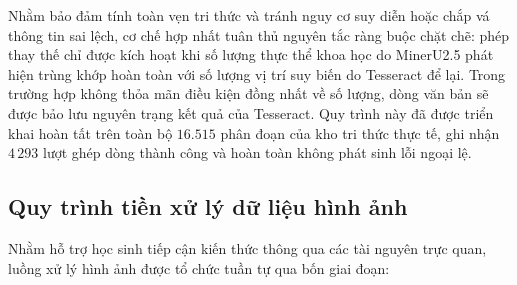 Nhằm bảo đảm tính toàn vẹn tri thức và tránh nguy cơ suy diễn hoặc chắp vá thông tin sai lệch, cơ chế hợp nhất tuân thủ nguyên tắc ràng buộc chặt chẽ: phép thay thế chỉ được kích hoạt khi số lượng thực thể khoa học do MinerU2.5 phát hiện trùng khớp hoàn toàn với số lượng vị trí suy biến do Tesseract để lại. Trong trường hợp không thỏa mãn điều kiện đồng nhất về số lượng, dòng văn bản sẽ được bảo lưu nguyên trạng kết quả của Tesseract. Quy trình này đã được triển khai hoàn tất trên toàn bộ $16.515$ phân đoạn của kho tri thức thực tế, ghi nhận $4\,293$ lượt ghép dòng thành công và hoàn toàn không phát sinh lỗi ngoại lệ.

\subsection{Quy trình tiền xử lý dữ liệu hình ảnh}
Nhằm hỗ trợ học sinh tiếp cận kiến thức thông qua các tài nguyên trực quan, luồng xử lý hình ảnh được tổ chức tuần tự qua bốn giai đoạn:
